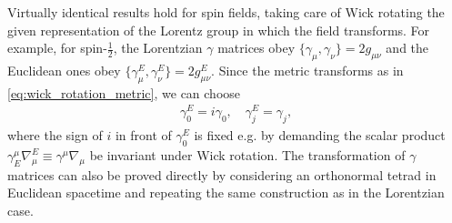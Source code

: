\documentclass[../QFT_main.tex]{subfiles}
\begin{document}
\begin{mytheorem}
Virtually identical results hold for spin fields, taking care of Wick rotating the given representation of the Lorentz group in which the field transforms.
For example, for spin-$\tfrac12$, the Lorentzian $\gamma$ matrices obey $\{\gamma_\mu,\gamma_\nu\}=2 g_{\mu\nu}$ and the Euclidean ones obey $\{\gamma_\mu^E,\gamma_\nu^E\}=2 g_{\mu\nu}^E$.
Since the metric transforms as in \eqref{eq:wick_rotation_metric}, we can choose
{\small\begin{align}\label{eq:wick_rotation_gamma_matrices}
    \gamma_0^E = i \gamma_0, \quad \gamma_j^E = \gamma_j,
\end{align}}
where the sign of $i$ in front of $\gamma_0^E$ is fixed e.g. by demanding the scalar product $\gamma^\mu_E\nabla_\mu^E\equiv \gamma^\mu \nabla_\mu$ be invariant under Wick rotation.
The transformation of $\gamma$ matrices can also be proved directly by considering an orthonormal tetrad in Euclidean spacetime and repeating the same construction as in the Lorentzian case.
%
\end{mytheorem}
\end{document}
